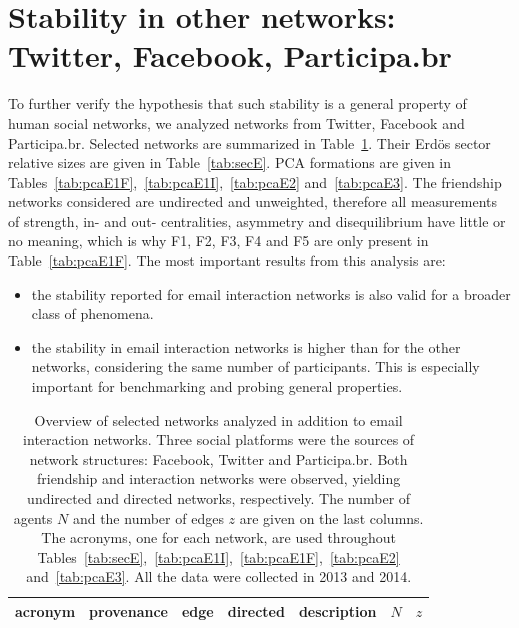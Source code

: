 \documentclass[%
	aip,
	jmp,%
	amsmath,amssymb,
	reprint,%
	floatfix,
]{revtex4-1}
\begin{document}
							\section{Stability in other networks: Twitter, Facebook, Participa.br}\label{si:ext}
							To further verify the hypothesis that such stability is a general property of human social networks,
							we analyzed networks from Twitter, Facebook and Participa.br. Selected networks are summarized in
							Table~\ref{tab:E}. Their Erd\"os sector relative sizes are given in Table~\ref{tab:secE}. PCA formations are given in
							Tables~\ref{tab:pcaE1F},~\ref{tab:pcaE1I},~\ref{tab:pcaE2} and~\ref{tab:pcaE3}. The friendship networks considered are undirected and unweighted, therefore all measurements of strength, in- and out- centralities, asymmetry and disequilibrium have little or no meaning, which is why F1, F2, F3, F4 and F5 are only present in Table~\ref{tab:pcaE1F}.
							The most important results from this analysis are:

							\begin{itemize}
								\item the stability reported for email interaction networks is also valid for a broader class of phenomena.
								\item the stability in email interaction networks is higher than for the other networks, considering the same number of participants. This is especially important for benchmarking and probing general properties.
							\end{itemize}

							\begin{table}[!h]
								\caption{Overview of selected networks analyzed in addition to email interaction networks. Three social platforms were the sources of network structures: Facebook, Twitter and Participa.br. Both friendship and interaction networks were observed, yielding undirected and directed networks, respectively. The number of agents $N$ and the number of edges $z$ are given on the last columns. The acronyms, one for each network, are used throughout Tables~\ref{tab:secE},~\ref{tab:pcaE1I},~\ref{tab:pcaE1F},~\ref{tab:pcaE2} and~\ref{tab:pcaE3}. All the data were collected in 2013 and 2014.}
								\begin{center}
									\begin{tabular}{| l | c | c | c | c | c | c | }\hline
										acronym & provenance & edge & directed & description & $N$ & $z$ \\ \hline\hline
										
										\hline
									\end{tabular}
								\end{center}
								\label{tab:E}
							\end{table}
\end{document}
